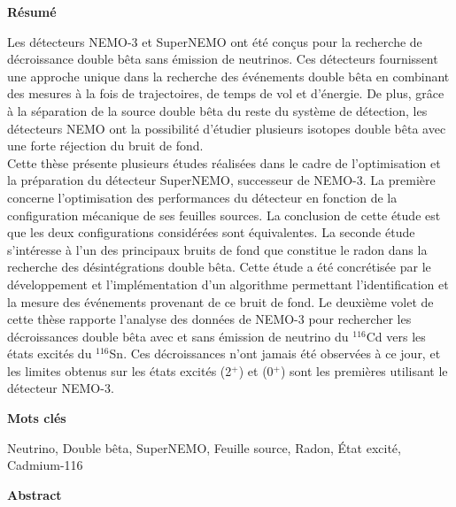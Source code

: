 \documentclass[main.tex]{subfiles}
\begin{document}



\NI \textbf{R\'esum\'e}

\bigskip

\NI \small{Les détecteurs NEMO-3 et SuperNEMO ont été conçus pour la recherche de décroissance double bêta sans émission de neutrinos. Ces détecteurs fournissent une approche unique dans la recherche des événements double bêta en combinant des mesures à la fois de trajectoires, de temps de vol et d'énergie. De plus, grâce à la séparation de la source double bêta du reste du système de détection, les détecteurs NEMO ont la possibilité d'étudier plusieurs isotopes double bêta avec une forte réjection du bruit de fond. \\
\noindent Cette thèse présente plusieurs études réalisées dans le cadre de l'optimisation et la préparation du détecteur SuperNEMO, successeur de NEMO-3. La première concerne l'optimisation des performances du détecteur en fonction de la configuration mécanique de ses feuilles sources. La conclusion de cette étude est que les deux configurations considérées sont équivalentes. La seconde étude s'intéresse à l'un des principaux bruits de fond que constitue le radon dans la recherche des désintégrations double bêta. Cette étude a été concrétisée par le développement et l'implémentation d'un algorithme permettant l'identification et la mesure des événements provenant de ce bruit de fond. Le deuxième volet de cette thèse rapporte l'analyse des données de NEMO-3 pour rechercher les décroissances double bêta avec et sans émission de neutrino du $^{\text{116}}$Cd vers les états excités du $^{\text{116}}$Sn. Ces décroissances n'ont jamais été observées à ce jour, et les limites obtenus sur les états excités (2$^+$) et (0$^+$) sont les premières utilisant le détecteur NEMO-3.}


\bigskip

\NI \textbf{Mots clés}

\smallskip

\NI \small{Neutrino, Double bêta, SuperNEMO, Feuille source, Radon, État excité, Cadmium-116}


\vspace{3cm}


\NI \textbf{Abstract}

\bigskip
\end{document}
